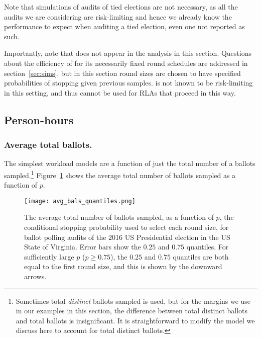 Note that simulations of audits of tied elections are not necessary, as all the audits we are considering are risk-limiting and hence we already know the performance to expect when auditing a tied election, even one not reported as such. 

Importantly, note that \Minerva does not appear in the analysis in this section. 
Questions about the efficiency of \Minerva for its necessarily fixed round schedules are addressed in section~\ref{sec:sims}, but in this section round sizes are chosen to have specified probabilities of stopping given previous samples. \Minerva is not known to be risk-limiting in this setting, and thus cannot be used for RLAs that proceed in this way.

\subsection{Person-hours}

\subsubsection{Average total ballots.} 
The simplest workload models are a function of just the total number of a ballots sampled.\footnote{Sometimes total \emph{distinct} ballots sampled is used, but for the margins we use in our examples in this section, the difference between total distinct ballots and total ballots is insignificant\cite{arxiv_athena}. It is straightforward to modify the model we discuss here to account for total distinct ballots.} Figure~\ref{fig:avg_bals} shows the average total number of ballots sampled as a function of $p$.
\begin{figure}[h!]
\texttt{[image: avg\_bals\_quantiles.png]}
\caption{The average total number of ballots sampled, as a function of $p$, the conditional stopping probability used to select each round size, for ballot polling audits of the 2016 US Presidential election in the US State of Virginia. Error bars show the $0.25$ and $0.75$ quantiles. For sufficiently large $p$ ($p\ge 0.75$), the $0.25$ and $0.75$ quantiles are both equal to the first round size, and this is shown by the downward arrows.}
\label{fig:avg_bals}
\end{figure}


